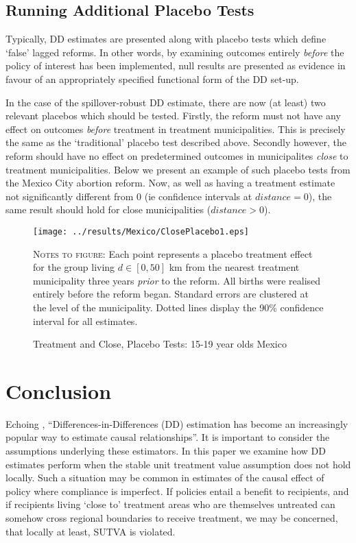 \documentclass{article}
\begin{document}
\begin{spacing}{1.1}
\subsection{Running Additional Placebo Tests}
Typically, DD estimates are presented along with placebo tests which define `false'
lagged reforms.  In other words, by examining outcomes entirely \emph{before} the
policy of interest has been implemented, null results are presented as evidence
in favour of an appropriately specified functional form of the DD set-up.

In the case of the spillover-robust DD estimate, there are now (at least) two
relevant placebos which should be tested.  Firstly, the reform must not have any
effect on outcomes \emph{before} treatment in treatment municipalities.  This is
precisely the same as the `traditional' placebo test described above.  Secondly
however, the reform should have no effect on predetermined outcomes in municipalites
\emph{close} to treatment municipalities.  Below we present an example of such 
placebo tests from the Mexico City abortion reform.  Now, as well as having a 
treatment estimate not significantly different from 0 (ie confidence intervals
at $distance=0$), the same result should hold for close municipalities ($distance>0$).
\begin{figure}[htpb!]
\texttt{[image: ../results/Mexico/ClosePlacebo1.eps]}
\caption{Treatment and Close, Placebo Tests: 15-19 year olds Mexico}
\label{SFig:MexClose}
\vspace{2mm}
\begin{footnotesize}
\textsc{Notes to figure}: Each point represents a placebo treatment effect for the 
group living $d\in [0,50]$ km from the nearest treatment municipality three years
\emph{prior} to the reform.  All births were realised entirely before the reform
began.  Standard errors are clustered at the level of the municipality.  Dotted 
lines display the 90\% confidence interval for all estimates.
\end{footnotesize}
\end{figure}



\section{Conclusion}
Echoing \citet{Bertrandetal2004}, ``Differences-in-Differences (DD) estimation has 
become an increasingly popular way to estimate causal relationships''.  It is 
important to consider the assumptions underlying these estimators.  
In this paper we examine how DD estimates perform when the stable unit treatment 
value assumption does not hold locally.  Such a situation may be common in estimates 
of the causal effect of policy where compliance is imperfect.  If policies entail a 
benefit to recipients, and if recipients living `close to' treatment areas who are 
themselves untreated can somehow cross regional boundaries to receive treatment, we 
may be concerned, that locally at least, SUTVA is violated.


\end{spacing}
\end{document}
